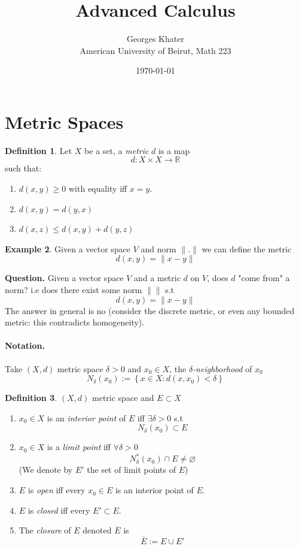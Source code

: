 \documentclass[11pt,a4paper]{article}
\title{\LARGE\bfseries Advanced Calculus}
\author{Georges Khater \\ \small American University of Beirut, Math 223}
\date{\today}
\theoremstyle{definition}
\newtheorem{definition}{Definition}[section]
\newtheorem{example}[definition]{Example}
\theoremstyle{plain}
\theoremstyle{remark}
\newcommand{\R}{\mathbb{R}}
\renewcommand{\set}[1]{\left\{ #1 \right\}}
\newcommand{\norm}[1]{\lVert #1 \rVert}
\begin{document}
\maketitle
\tableofcontents
\bigskip

\section{Metric Spaces}
\begin{definition}
    Let $X$ be a set, a \emph{metric} $d$ is a map 
    $$d \colon X \times X \to \R$$
    such that: 
    \begin{enumerate}[label = (\roman*)]
        \item $d(x,y) \geq 0$ with equality iff $x = y$. 
        \item $d(x,y) = d(y,x)$
        \item $d(x,z) \leq d(x,y) + d(y,z)$
    \end{enumerate}
\end{definition}

\begin{example}
    Given a vector space $V$ and norm $\norm{.}$ we can define the metric 
    $$d(x,y) = \norm{x-y}$$
\end{example}

\textbf{Question.} Given a vector space $V$ and a metric $d$ on $V$, does $d$ "come from" a norm? i.e does there exist some norm $\norm{}$ s.t 
$$d(x,y) = \norm{x-y}$$
The answer in general is no (consider the discrete metric, or even any bounded metric: this contradicts homogeneity). 

\paragraph{Notation.} Take $(X,d)$ metric space $\delta > 0$ and $x_0 \in X$, the \emph{$\delta$-neighborhood} of $x_0$ 
$$N_\delta(x_0) := \set{x \in X \colon d(x,x_0) < \delta}$$

\begin{definition}
    $(X,d)$ metric space and $E \subset X$ 
    \begin{enumerate}[label = (\roman*)]
        \item $x_0 \in X$ is an \emph{interior point} of $E$ iff $\exists \delta > 0$ s.t 
        $$N_\delta (x_0) \subset E$$
        \item $x_0 \in X$ is a \emph{limit point} iff $\forall \delta > 0$ 
        $$N_\delta^* (x_0) \cap E \neq \varnothing$$
        (We denote by $E'$ the set of limit points of $E$) 
        \item $E$ is \emph{open} iff every $x_0 \in E$ is an interior point of $E$. 
        \item $E$ is \emph{closed} iff every $E' \subset E$.  
        \item The \emph{closure} of $E$ denoted $\overline{E}$ is 
        $$\overline{E} := E \cup E'$$
    \end{enumerate}
\end{definition}
\end{document}
